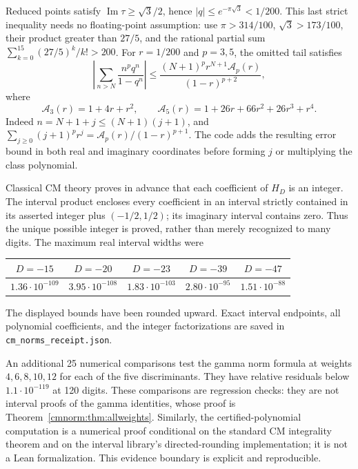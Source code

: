 Reduced points satisfy $\operatorname{Im}\tau\geq\sqrt3/2$, hence
$|q|\leq e^{-\pi\sqrt3}<1/200$. This last strict inequality needs
no floating-point assumption: use $\pi>314/100$,
$\sqrt3>173/100$, their product greater than $27/5$, and the rational
partial sum $\sum_{k=0}^{15}(27/5)^k/k!>200$.
For $r=1/200$ and $p=3,5$, the omitted tail satisfies
\begin{equation}
 \left|\sum_{n>N}\frac{n^pq^n}{1-q^n}\right|
 \leq\frac{(N+1)^p r^{N+1}\mathcal A_p(r)}{(1-r)^{p+2}},
 \label{cmnorm:eq:tail}
\end{equation}
where
\[
 \mathcal A_3(r)=1+4r+r^2,\qquad
 \mathcal A_5(r)=1+26r+66r^2+26r^3+r^4.
\]
Indeed $n=N+1+j\leq(N+1)(j+1)$, and
$\sum_{j\geq0}(j+1)^pr^j=\mathcal A_p(r)/(1-r)^{p+1}$.
The code adds the resulting error bound in both real and imaginary
coordinates before forming $j$ or multiplying the class polynomial.

Classical CM theory proves in advance that each coefficient of $H_D$
is an integer. The interval product encloses every coefficient in an
interval strictly contained in its asserted integer plus
$(-1/2,1/2)$; its imaginary interval contains zero. Thus the unique
possible integer is proved, rather than merely recognized to many digits.
The maximum real interval widths were
\begin{center}
\begin{tabular}{c c c c c}
\toprule
$D=-15$&$D=-20$&$D=-23$&$D=-39$&$D=-47$\\
\midrule
$1.36\cdot10^{-109}$&$3.95\cdot10^{-108}$&$1.83\cdot10^{-103}$&
$2.80\cdot10^{-95}$&$1.51\cdot10^{-88}$\\
\bottomrule
\end{tabular}
\end{center}
The displayed bounds have been rounded upward. Exact interval endpoints,
all polynomial coefficients, and the integer factorizations are saved
in \texttt{cm\_norms\_receipt.json}.

An additional 25 numerical comparisons test the gamma norm formula at
weights $4,6,8,10,12$ for each of the five discriminants. They have
relative residuals below $1.1\cdot10^{-119}$ at 120 digits. These
comparisons are regression checks: they are not interval proofs of the
gamma identities, whose proof is Theorem~\ref{cmnorm:thm:allweights}.
Similarly, the certified-polynomial computation is a numerical proof
conditional on the standard CM integrality theorem and on the interval
library's directed-rounding implementation; it is not a Lean
formalization. This evidence boundary is explicit and reproducible.


